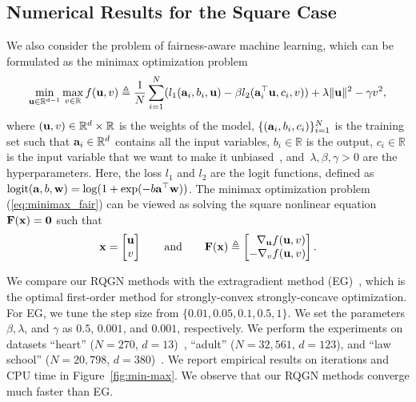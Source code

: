 \documentclass[11pt]{article}
\theoremstyle{plain}
\theoremstyle{definition}
\theoremstyle{remark}
\theoremstyle{plain}
\def\vzero{{\bf{0}}}
\def\va{{\bf{a}}}
\def\vu{{\bf{u}}}
\def\vx{{\bf{x}}}
\def\BR{{\mathbb{R}}}
\def\mF {{\bf F}}
\def\vx {{{\bf x}}}
\def\va {{{\bf a}}}
\def\BR{{\mathbb{R}}}
\def\F{{\bf F}}
\def\u{{\bf u}}
\def\w{{\bf w}}
\def\x{{\bf x}}
\def\RB{{\mathbb R}}
\begin{document}
\subsection{Numerical Results for the Square Case}
We also consider the problem of fairness-aware machine learning, which can be formulated as the minimax optimization problem
\begin{align}
\label{eq:minimax_fair}
\min_{\u\in\RB^{d-1}}\max_{v\in\RB}    f(\u,v) \triangleq \frac{1}{N}\sum_{i=1}^N(l_1(\va_i,b_i,\u)-\beta l_2(\va_i^\top\u,c_i,v))+\lambda\|\u\|^2-\gamma v^2,
\end{align}
where $(\vu,v)\in\BR^d\times\BR$ is the weights of the model, $\{(\va_i,b_i,c_i)\}_{i=1}^N$ is the training set such that $\va_i\in\RB^{d}$ contains all the input variables, $b_i\in\RB$ is the output, $c_i\in\RB$ is the input variable that we want to make it unbiased~\citep{lowd2005adversarial,zhang2018mitigating}, and~$\lambda,\beta,\gamma>0$ are the hyperparameters.
Here, the loss $l_1$ and $l_2$ are the logit functions, defined as ${\rm logit}(\va,b,\w)= \log(1+\exp(-b\va^\top\w))$.
The minimax optimization problem (\ref{eq:minimax_fair}) can be viewed as solving the square nonlinear equation $\mF(\vx)=\vzero$ such that
\begin{align}\label{eq:min-max}
\x = \begin{bmatrix}
\u \\ v    
\end{bmatrix}
\qquad\text{and}\qquad
\F(\x)\triangleq \begin{bmatrix}
~~\nabla_{\u}f(\u,v)\\
-\nabla_v f(\u,v)
\end{bmatrix}.
\end{align}

We compare our RQGN methods with the extragradient method (EG)~\citep{korpelevich1976extragradien,tseng1995linear}, which is the optimal first-order method for strongly-convex strongly-concave optimization.
For EG, we tune the step size from $\{0.01,0.05, 0.1, 0.5, 1\}$.
We set the parameters $\beta,\lambda$, and $\gamma$ as $0.5$, $0.001$, and $0.001$, respectively.
We perform the experiments on datasets ``heart'' ($N=270$, $d = 13$)~\citep{CC01a},  ``adult'' ($N= 32,561$, $d= 123$), and ``law school'' ($N=20,798$, $d= 380$)~\citep{quy2021survey}.
We report empirical results on iterations and CPU time in
Figure~\ref{fig:min-max}.
We observe that our RQGN methods converge much faster than EG.
\end{document}
